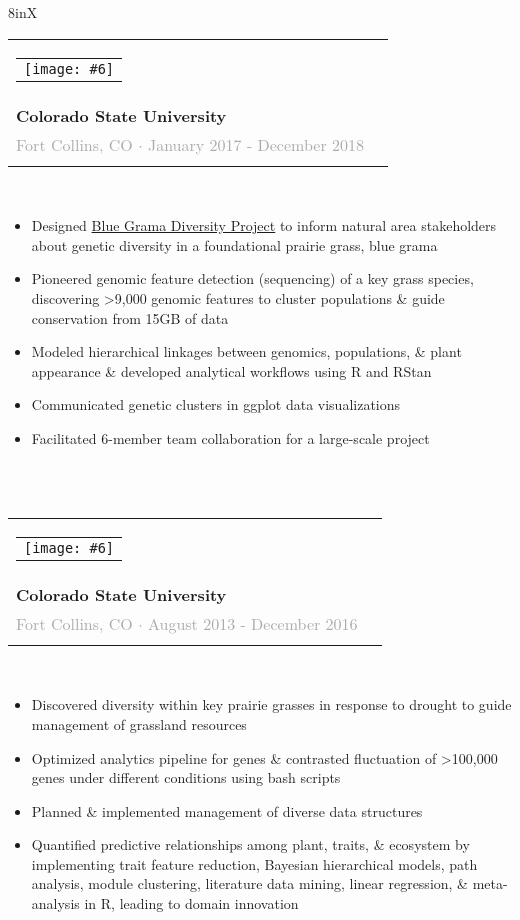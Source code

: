 \documentclass[fontsize=10pt]{scrlttr2}
\newcommand{\experienceboxsize}{8in}
\newcommand{\logosize}{0.6cm}
\newcommand{\logopad}{-0.6cm}
\newcommand{\experienceitem}[6]{
    {\begin{tabularx}{\experienceboxsize}{lX}
    	\begin{tabular}{c}
		{\texttt{[image: \#6]}} \hspace{\logopad}
	\end{tabular}
        & 
         \begin{tabular}{ll}
                \small\textbf{#1} \\
                \small\textbf{#2} \vspace{-0.1cm} \\
                \scriptsize\textcolor{darkgray}{#3 $\cdot$ #4} \\
         \end{tabular}
    \end{tabularx}} \\
    
    \vspace{-0.5cm}
    \begin{itemize}
    \footnotesize 
    \itemsep-0.5em 
	#5
    \end{itemize} \\
}
\begin{document}
\begin{tabularx}{\experienceboxsize}{X}
    \experienceitem{USDA NIFA Predoctoral Fellow}{Colorado State University}{Fort Collins, CO}{January 2017 - December 2018}{
        \item Designed \textcolor{special}{\href{https://github.com/avahoffman/blue-grama-diversity}{Blue Grama Diversity Project}} to inform natural area stakeholders about genetic diversity in a foundational prairie grass, blue grama
        		\vspace{1mm} 
        \item Pioneered genomic feature detection (sequencing) of a key grass species, discovering >9,000 genomic features to cluster populations \& guide conservation from 15GB of data
        		\vspace{1mm} 
        \item Modeled hierarchical linkages between genomics, populations, \& plant appearance \& developed analytical workflows using R and RStan
        		\vspace{1mm} 
        \item Communicated genetic clusters in ggplot data visualizations 
                \vspace{1mm} 
        \item Facilitated 6-member team collaboration for a large-scale project 
    }{csu} \\
    
    \vspace{-0.8cm}
    
    \experienceitem{Doctoral Researcher}{Colorado State University}{Fort Collins, CO}{August 2013 - December 2016}{
        \item Discovered diversity within key prairie grasses in response to drought to guide management of grassland resources 
      		\vspace{1mm} 
	\item Optimized analytics pipeline for genes \& contrasted fluctuation of >100,000 genes under different conditions using bash scripts
		\vspace{1mm} 
	\item Planned \& implemented management of diverse data structures
	       \vspace{1mm} 
	\item Quantified predictive relationships among plant, traits, \& ecosystem by implementing trait feature reduction, Bayesian hierarchical models, path analysis, module clustering, literature data mining, linear regression, \& meta-analysis in R, leading to domain innovation
    }{csu} \\
    
\end{tabularx} \\
\end{document}
